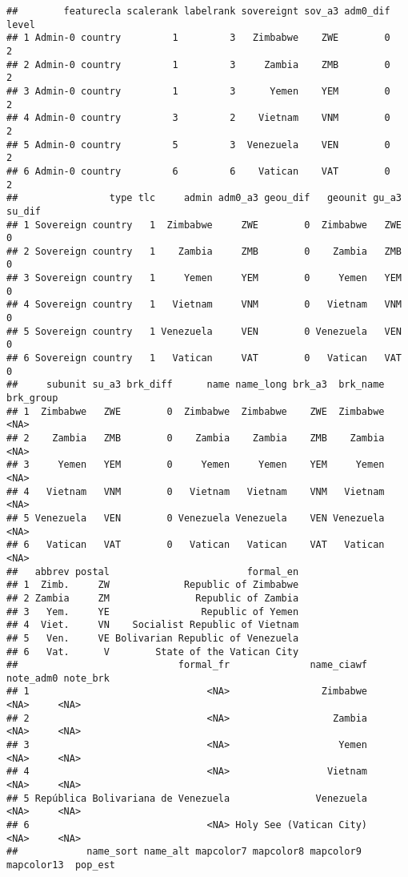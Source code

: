 \documentclass[
]{article}
\begin{document}
\begin{verbatim}
##        featurecla scalerank labelrank sovereignt sov_a3 adm0_dif level
## 1 Admin-0 country         1         3   Zimbabwe    ZWE        0     2
## 2 Admin-0 country         1         3     Zambia    ZMB        0     2
## 3 Admin-0 country         1         3      Yemen    YEM        0     2
## 4 Admin-0 country         3         2    Vietnam    VNM        0     2
## 5 Admin-0 country         5         3  Venezuela    VEN        0     2
## 6 Admin-0 country         6         6    Vatican    VAT        0     2
##                type tlc     admin adm0_a3 geou_dif   geounit gu_a3 su_dif
## 1 Sovereign country   1  Zimbabwe     ZWE        0  Zimbabwe   ZWE      0
## 2 Sovereign country   1    Zambia     ZMB        0    Zambia   ZMB      0
## 3 Sovereign country   1     Yemen     YEM        0     Yemen   YEM      0
## 4 Sovereign country   1   Vietnam     VNM        0   Vietnam   VNM      0
## 5 Sovereign country   1 Venezuela     VEN        0 Venezuela   VEN      0
## 6 Sovereign country   1   Vatican     VAT        0   Vatican   VAT      0
##     subunit su_a3 brk_diff      name name_long brk_a3  brk_name brk_group
## 1  Zimbabwe   ZWE        0  Zimbabwe  Zimbabwe    ZWE  Zimbabwe      <NA>
## 2    Zambia   ZMB        0    Zambia    Zambia    ZMB    Zambia      <NA>
## 3     Yemen   YEM        0     Yemen     Yemen    YEM     Yemen      <NA>
## 4   Vietnam   VNM        0   Vietnam   Vietnam    VNM   Vietnam      <NA>
## 5 Venezuela   VEN        0 Venezuela Venezuela    VEN Venezuela      <NA>
## 6   Vatican   VAT        0   Vatican   Vatican    VAT   Vatican      <NA>
##   abbrev postal                        formal_en
## 1  Zimb.     ZW             Republic of Zimbabwe
## 2 Zambia     ZM               Republic of Zambia
## 3   Yem.     YE                Republic of Yemen
## 4  Viet.     VN    Socialist Republic of Vietnam
## 5   Ven.     VE Bolivarian Republic of Venezuela
## 6   Vat.      V        State of the Vatican City
##                            formal_fr              name_ciawf note_adm0 note_brk
## 1                               <NA>                Zimbabwe      <NA>     <NA>
## 2                               <NA>                  Zambia      <NA>     <NA>
## 3                               <NA>                   Yemen      <NA>     <NA>
## 4                               <NA>                 Vietnam      <NA>     <NA>
## 5 República Bolivariana de Venezuela               Venezuela      <NA>     <NA>
## 6                               <NA> Holy See (Vatican City)      <NA>     <NA>
##            name_sort name_alt mapcolor7 mapcolor8 mapcolor9 mapcolor13  pop_est

\end{verbatim}
\end{document}
